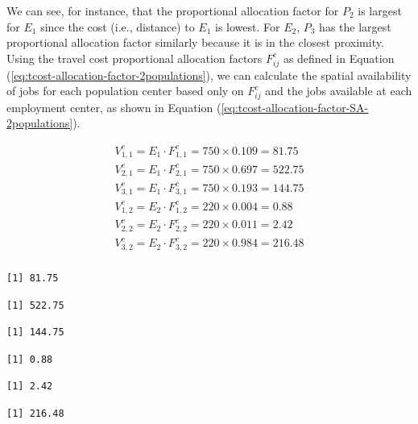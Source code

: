 \documentclass[]{elsarticle} %
\begin{document}
We can see, for instance, that the proportional allocation factor for
\(P_2\) is largest for \(E_1\) since the cost (i.e., distance) to
\(E_1\) is lowest. For \(E_2\), \(P_3\) has the largest proportional
allocation factor similarly because it is in the closest proximity.
Using the travel cost proportional allocation factors \(F^c_{ij}\) as
defined in Equation (\ref{eq:tcost-allocation-factor-2populations}), we
can calculate the spatial availability of jobs for each population
center based only on \(F^c_{ij}\) and the jobs available at each
employment center, as shown in Equation
(\ref{eq:tcost-allocation-factor-SA-2populations}).

\begin{equation}
\label{eq:tcost-allocation-factor-SA-2populations}
\begin{array}{l}
V^c_{1,1} = E_1 \cdot F^c_{1,1} = 750 \times 0.109 = 81.75\\
V^c_{2,1} = E_1 \cdot F^c_{2,1} = 750 \times  0.697 = 522.75\\
V^c_{3,1} = E_1 \cdot F^c_{3,1} = 750 \times  0.193 = 144.75\\
V^c_{1,2} = E_2 \cdot F^c_{1,2} = 220 \times 0.004 = 0.88\\
V^c_{2,2} = E_2 \cdot F^c_{2,2} = 220 \times  0.011 = 2.42\\
V^c_{3,2} = E_2 \cdot F^c_{3,2} = 220 \times  0.984 = 216.48\\
\end{array}
\end{equation}

\begin{verbatim}
[1] 81.75
\end{verbatim}

\begin{verbatim}
[1] 522.75
\end{verbatim}

\begin{verbatim}
[1] 144.75
\end{verbatim}

\begin{verbatim}
[1] 0.88
\end{verbatim}

\begin{verbatim}
[1] 2.42
\end{verbatim}

\begin{verbatim}
[1] 216.48
\end{verbatim}
\end{document}
